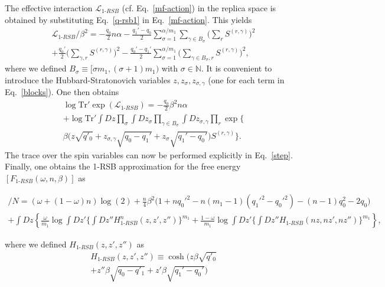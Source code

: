 \documentclass[twocolumn,superscriptaddress,prb,10pt]{revtex4-1}
\def\tr{\textrm{Tr}}
\begin{document}
The effective interaction ${\mathcal L}_{1\textrm{-}RSB}$ (cf. Eq.~\eqref{mf-action}) 
in the replica space is obtained by substituting Eq.~\eqref{q-rsb1} in Eq.~\eqref{mf-action}. 
This yields  
%
\begin{multline}
{\mathcal L}_{1\textrm{-}RSB}/\beta^2=-\frac{q_0}{2}n\alpha
-\frac{q_1'-q_0}{2}\sum\limits_{\sigma=1}^{\alpha/m_1}
\sum\limits_{\gamma\in B_\sigma}\Big(\sum_r S^{(r,\gamma)}\Big)^2\\
+\frac{q_0'}{2}\Big(\sum\limits_{\gamma,r}
S^{(r,\gamma)}\Big)^2-
\frac{q_0'-q_1'}{2}\sum\limits_{\sigma=1}^{\alpha/m_1}
\Big(\sum\limits_{\gamma\in B_\sigma,r}S^{(r,\gamma)}\Big)^2,
\label{blocks}
\end{multline}
%
where we defined $B_\sigma\equiv[\sigma m_1,(\sigma+1)m_1)$ with $\sigma\in\mathbb{N}$. 
It is convenient to introduce the Hubbard-Stratonovich variables $z,z_\sigma,z_{\sigma,\gamma}$ 
(one for each term in Eq.~\eqref{blocks}). One then obtains 
%
\begin{multline}
\label{step}
\log\tr'\exp({\mathcal L}_{1\textrm{-}RSB})=
-\frac{q_0}{2}\beta^2 n\alpha\\
+\log\tr'\int Dz\prod_\sigma\int Dz_\sigma\prod\limits_{\gamma\in B_\sigma}
\int Dz_{\sigma,\gamma}\prod_r\exp\Big\{\\
\beta\Big(z\sqrt{q'_0}+z_{\sigma,\gamma}\sqrt{q_0-q_1'}+
z_{\sigma}\sqrt{q_1'-q_0'}\Big)S^{(r,\gamma)}\Big\}.
\end{multline}
%
The trace over the spin variables can now be performed explicitly in Eq.~\eqref{step}. 
Finally, one obtains the 1-RSB approximation for the free energy 
$[F_{1\textrm{-}RSB}(\omega,n,\beta)]$ as 
%
\begin{widetext}
\begin{multline}
[F_{1\textrm{-}RSB}(\omega,n\beta)]/N=
(\omega+(1-\omega)n)\log(2)+
\frac{n}{4}\beta^2\Big(1+nq_0'^2
-n(m_1-1)(q_1'^2-q_0'^2)-
(n-1)q_0^2-2q_0\Big)\\
+\int Dz\left\{\frac{\omega}{m_1}\log\int Dz'\Big\{\int Dz''
H_{1\textrm{-}RSB}^n(z,z',z'')\Big\}^{m_1}
+\frac{1-\omega}{m_1}
\log\int Dz'\Big\{\int Dz''
H_{1\textrm{-}RSB}(nz,nz',nz'')\Big\}^{m_1}
\right\}, 
\label{RSB-1-logZ}
\end{multline}
\end{widetext}
%
where we defined $H_{1\textrm{-}RSB}(z,z',z'')$ as 
%
\begin{multline}
H_{1\textrm{-}RSB}(z,z',z'')\equiv\cosh(z\beta\sqrt{q'_0}\\+
z''\beta\sqrt{q_0-q'_1} +z'\beta\sqrt{q_1'-q_0'})
\label{H1}
\end{multline}
\end{document}
